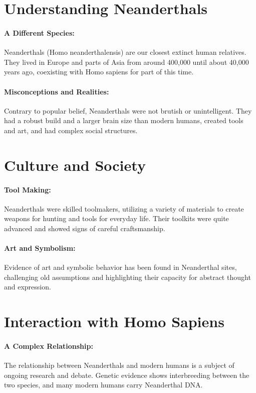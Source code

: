 \documentclass[a4paper,12pt]{book}
\begin{document}
\section*{Understanding Neanderthals}

\paragraph{A Different Species:}
Neanderthals (Homo neanderthalensis) are our closest extinct human relatives. They lived in Europe and parts of Asia from around 400,000 until about 40,000 years ago, coexisting with Homo sapiens for part of this time.

\paragraph{Misconceptions and Realities:}
Contrary to popular belief, Neanderthals were not brutish or unintelligent. They had a robust build and a larger brain size than modern humans, created tools and art, and had complex social structures.

\section*{Culture and Society}

\paragraph{Tool Making:}
Neanderthals were skilled toolmakers, utilizing a variety of materials to create weapons for hunting and tools for everyday life. Their toolkits were quite advanced and showed signs of careful craftsmanship.

\paragraph{Art and Symbolism:}
Evidence of art and symbolic behavior has been found in Neanderthal sites, challenging old assumptions and highlighting their capacity for abstract thought and expression.

\section*{Interaction with Homo Sapiens}

\paragraph{A Complex Relationship:}
The relationship between Neanderthals and modern humans is a subject of ongoing research and debate. Genetic evidence shows interbreeding between the two species, and many modern humans carry Neanderthal DNA.
\end{document}
